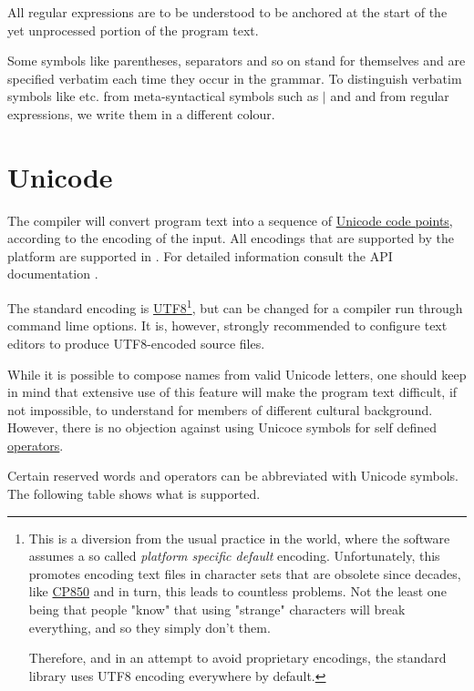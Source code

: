 All regular expressions are to be understood to be anchored at the start of the yet unprocessed portion of the program text.

\par Some symbols like parentheses, separators and so on stand for themselves and are specified verbatim each time they occur in the grammar. To distinguish verbatim symbols like \sym{<- , ; ::} etc. from meta-syntactical symbols such as {\Large $|$} and  and from regular expressions, we write them in a different colour.

\section{Unicode}

The \frege{} compiler will convert program text into a sequence of \href{https://en.wikipedia.org/wiki/Code_point}{Unicode code points}, according to the encoding of the input.  
All encodings that are supported by the \java{} platform are supported in \frege{}.
For detailed information consult the \java{}
API documentation \cite{apidoc}. 

The standard encoding is  \href{https://en.wikipedia.org/wiki/UTF-8}{UTF8}\footnote{
This is a diversion from the usual practice in the \java{} world, where the \java{} software assumes a so called \emph{platform specific default} encoding. Unfortunately, this promotes  encoding text files in character sets that are obsolete since decades, like \href{https://de.wikipedia.org/wiki/Codepage_850}{CP850} and in turn, this leads to countless problems. Not the least one being that people "know" that using "strange" characters will break everything, and so they simply don't them. 

Therefore, and in an attempt to avoid proprietary encodings, the \frege{} standard library uses UTF8 encoding everywhere by default.}, 
but can be changed for a compiler run through command lime options. It is, however, strongly recommended to configure text editors to produce UTF8-encoded \frege{} source files.

While it is possible to compose names from
valid Unicode letters, 
one should keep in mind that extensive use of
this feature will make the program text
difficult, 
if not impossible, 
to understand for members of different cultural background.
However, there is no objection against using Unicoce symbols for self defined \hyperref[operator]{operators}.

Certain reserved words and operators can be abbreviated with Unicode symbols. The following table shows what is supported.

